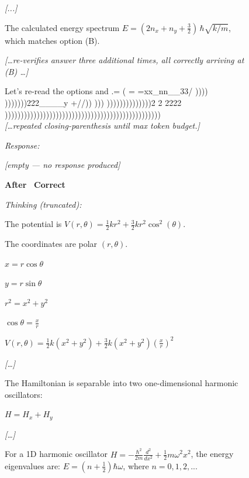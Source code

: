 \begin{figure}[t]
\begin{minipage}[t]{0.49\textwidth}
\begin{mdframed}[style=beforebox]
\begin{mdframed}[style=thinkbox]
\textit{[...]}

The calculated energy spectrum $E = (2n_x + n_y + \tfrac{3}{2})\,\hbar\sqrt{k/m}$, which matches option (B).

\medskip
\textit{[\ldots re-verifies answer three additional times, all correctly arriving at (B) \ldots]}

\medskip
\noindent Let's re-read the options and
\quad .\qquad = ( = =xx\_nn\_\_33/ \qquad ))))
\smallskip
)))))))222\_\_\_\_y +//)) ))) ))))))))))))))2 2 2222\\
)))))))))))))))))))))))))))))))))))))))))))))))))\\
{\itshape [\ldots repeated closing-parenthesis until max token budget.]}
\end{mdframed}
\vspace{2pt}
\noindent\textit{Response:}
\begin{mdframed}[style=thinkbox]
\textit{[empty --- no response produced]}
\end{mdframed}
\end{mdframed}
\end{minipage}%
\hfill
\begin{minipage}[t]{0.49\textwidth}
\begin{mdframed}[style=afterbox]
\noindent\textbf{After \sdrlfootnotesize} \hfill {\colorbox{afterbg}{\textcolor{afterframe}{\textbf{\checkmark~Correct}}}}

\noindent\textit{Thinking (truncated):}
\begin{mdframed}[style=thinkbox]
The potential is $V(r, \theta) = \frac{1}{2}kr^2 + \frac{3}{2}kr^2\cos^2(\theta)$.

\quad The coordinates are polar $(r, \theta)$.

\quad $x = r\cos\theta$

\quad $y = r\sin\theta$

\quad $r^2 = x^2 + y^2$

\quad $\cos\theta = \frac{x}{r}$

\quad $V(r, \theta) = \frac{1}{2}k(x^2+y^2) + \frac{3}{2}k(x^2+y^2)(\frac{x}{r})^2$

\textit{[\ldots]}

The Hamiltonian is separable into two one-dimensional harmonic oscillators:

\quad $H = H_x + H_y$

\textit{[\ldots]}

For a 1D harmonic oscillator $H = -\frac{\hbar^2}{2m}\frac{d^2}{dx^2} + \frac{1}{2}m\omega^2x^2$, the energy eigenvalues are:
    $E = (n+\frac{1}{2})\hbar\omega$, where $n = 0, 1, 2, ...$


\end{mdframed}
\end{mdframed}
\end{minipage}
\end{figure}
